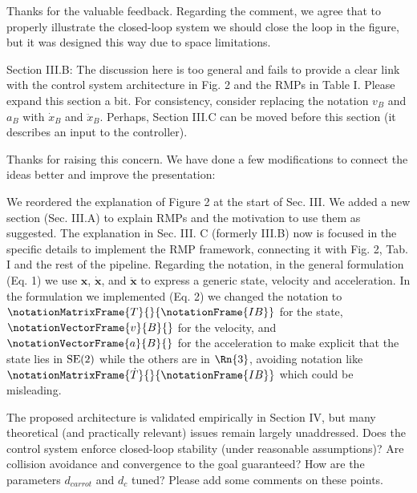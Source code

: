 \documentclass[a4paper,11pt]{article}
\begin{document}
Thanks for the valuable feedback. Regarding the comment, we agree that to 
properly illustrate the closed-loop system we should close the loop in the 
figure, but it was designed this way due to space limitations.

\begin{displayquote}
	Section III.B: The discussion here is too general and fails to
	provide a clear link with the control system architecture in Fig. 2 and
	the RMPs in Table I. Please expand this section a bit. For consistency,
	consider replacing the notation $v_B$ and $a_B$ with $\dot{x}_B$ and
	$\ddot{x}_B$. Perhaps, Section III.C can be moved before this section (it
	describes an input to the controller).
\end{displayquote}

Thanks for raising this concern. We have done a few modifications to connect 
the ideas better and improve the presentation:
\begin{outline}[enumerate]
	\1 We reordered the explanation of Figure 2 at the start of Sec. III.
	\1 We added a new section (Sec. III.A) to explain RMPs and the 
	motivation to use them as suggested. 
	\1 The explanation in Sec. III. C (formerly III.B) now is focused in the 
	specific details to implement the RMP framework, connecting it with Fig. 
	2, Tab. I and the rest of the pipeline.
	\1 Regarding the notation, in the general formulation (Eq. 1) we 
	use $\mathbf{x}$, $\mathbf{\dot{x}}$, and $\mathbf{\ddot{x}}$ to express a 
	generic state, velocity and acceleration. In the formulation we implemented 
	(Eq. 2) we changed the 
	notation to $\notationMatrixFrame{T}{}{\notationFrame{IB}}$ for the state, 
	$\notationVectorFrame{v}{B}{}$ for the velocity, and 
	$\notationVectorFrame{a}{B}{}$ for the acceleration to make explicit that 
	the state lies in $\textrm{SE}(2)$ while the others are in $\Rn{3}$, avoiding 
	notation like $\notationMatrixFrame{\dot{T}}{}{\notationFrame{IB}}$ which 
	could be misleading.
	
\end{outline}

\begin{displayquote}
	The proposed architecture is validated empirically in Section IV, but
	many theoretical (and practically relevant) issues remain largely
	unaddressed. Does the control system enforce closed-loop stability
	(under reasonable assumptions)? Are collision avoidance and convergence
	to the goal guaranteed? How are the parameters $d_{carrot}$ and $d_c$ tuned?
	Please add some comments on these points.
\end{displayquote}
\end{document}
